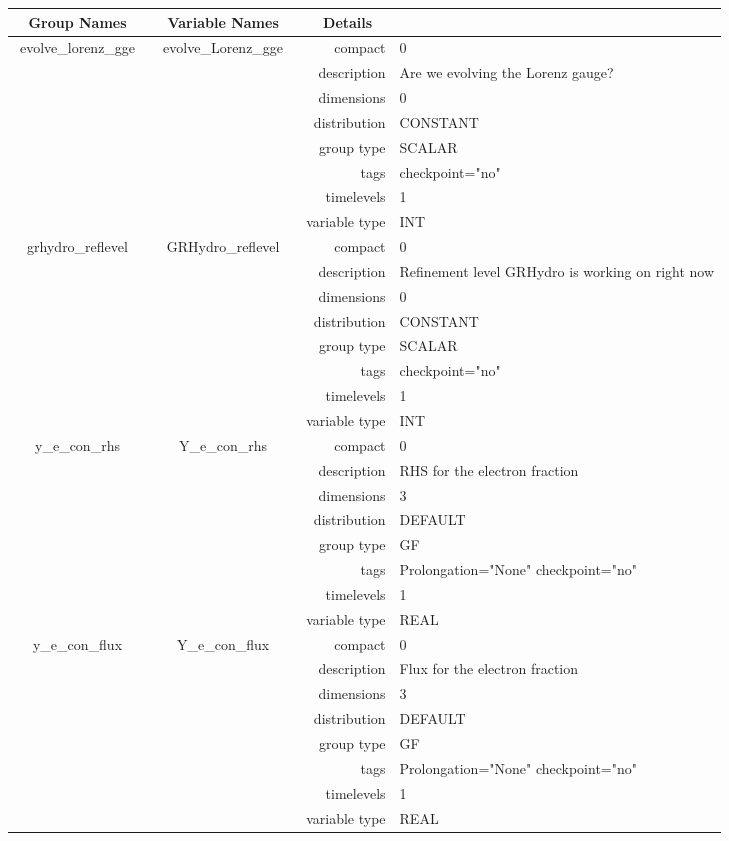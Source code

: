 \documentclass{article}
\begin{document}
\begin{tabular*}{150mm}{|c|c@{\extracolsep{\fill}}|rl|} \hline 
~ {\bf Group Names} ~ & ~ {\bf Variable Names} ~  &{\bf Details} ~ & ~ \\ 
\hline 
evolve\_lorenz\_gge & evolve\_Lorenz\_gge & compact & 0 \\ 
 &  & description & Are we evolving the Lorenz gauge? \\ 
 &  & dimensions & 0 \\ 
 &  & distribution & CONSTANT \\ 
 &  & group type & SCALAR \\ 
 &  & tags & checkpoint="no" \\ 
 &  & timelevels & 1 \\ 
 &  & variable type & INT \\ 
\hline 
grhydro\_reflevel & GRHydro\_reflevel & compact & 0 \\ 
 &  & description & Refinement level GRHydro is working on right now \\ 
 &  & dimensions & 0 \\ 
 &  & distribution & CONSTANT \\ 
 &  & group type & SCALAR \\ 
 &  & tags & checkpoint="no" \\ 
 &  & timelevels & 1 \\ 
 &  & variable type & INT \\ 
\hline 
y\_e\_con\_rhs & Y\_e\_con\_rhs & compact & 0 \\ 
 &  & description & RHS for the electron fraction \\ 
 &  & dimensions & 3 \\ 
 &  & distribution & DEFAULT \\ 
 &  & group type & GF \\ 
 &  & tags & Prolongation="None" checkpoint="no" \\ 
 &  & timelevels & 1 \\ 
 &  & variable type & REAL \\ 
\hline 
y\_e\_con\_flux & Y\_e\_con\_flux & compact & 0 \\ 
 &  & description & Flux for the electron fraction \\ 
 &  & dimensions & 3 \\ 
 &  & distribution & DEFAULT \\ 
 &  & group type & GF \\ 
 &  & tags & Prolongation="None" checkpoint="no" \\ 
 &  & timelevels & 1 \\ 
 &  & variable type & REAL \\ 
\hline 
\end{tabular*} 
\end{document}
